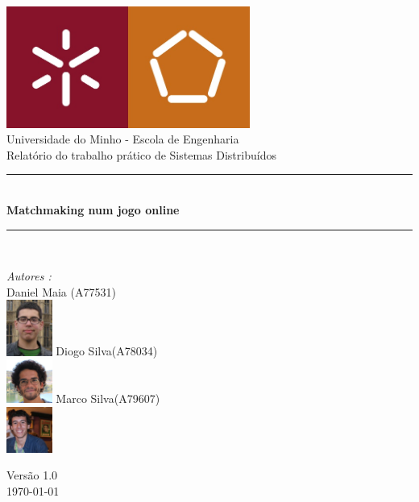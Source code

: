 \documentclass[a4paper]{article}
\begin{document}
\begin{titlepage}
\begin{center}


\includegraphics[width=0.6\textwidth]{logo.jpg}\\[0.5cm]

{\large Universidade do Minho - Escola de Engenharia}\\[0.5cm]

{\large Relatório do trabalho prático de Sistemas Distribuídos}\\[0.5cm]

\rule{\linewidth}{0.5mm} \\[0.4cm]
{ \huge \bfseries Matchmaking num jogo online \\[0.4cm] }
\rule{\linewidth}{0.5mm} \\[1.5cm]

\noindent
\begin{minipage}{0.4\textwidth}
  \begin{flushleft} \large
    \emph{Autores :}\\
    Daniel Maia \textsc{(A77531)}\\
    \includegraphics[width=1.5cm]{daniel.jpg}\break
    Diogo Silva\textsc{(A78034)}\\
    \includegraphics[width=1.5cm]{afonso.jpg}\break
    Marco Silva\textsc{(A79607)}\\
    \includegraphics[width=1.5cm]{marco.jpg}\break
  \end{flushleft}
\end{minipage}%
\vfill

{\large Versão 1.0 \\ \today}

\end{center}
\end{titlepage}
\end{document}

